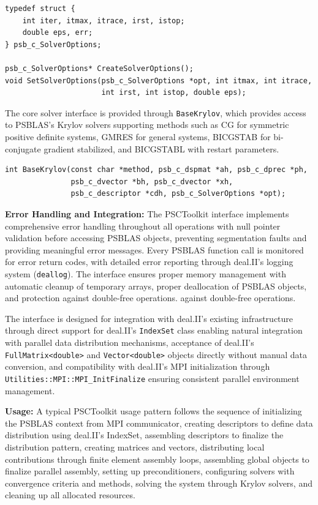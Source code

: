 \documentclass[a4paper,12pt]{article}
\begin{document}
\begin{lstlisting}[caption=Solver options structure and management]
typedef struct {
    int iter, itmax, itrace, irst, istop;
    double eps, err;
} psb_c_SolverOptions;

psb_c_SolverOptions* CreateSolverOptions();
void SetSolverOptions(psb_c_SolverOptions *opt, int itmax, int itrace,
                      int irst, int istop, double eps);
\end{lstlisting}

The core solver interface is provided through \texttt{BaseKrylov}, which provides access to 
PSBLAS's Krylov solvers supporting methods such as CG for symmetric positive definite 
systems, GMRES for general systems, BICGSTAB for bi-conjugate gradient stabilized, 
and BICGSTABL with restart parameters.

\begin{lstlisting}[caption=Krylov solver interface]
int BaseKrylov(const char *method, psb_c_dspmat *ah, psb_c_dprec *ph,
               psb_c_dvector *bh, psb_c_dvector *xh,
               psb_c_descriptor *cdh, psb_c_SolverOptions *opt);
\end{lstlisting}

\textbf{Error Handling and Integration:} The PSCToolkit interface implements 
comprehensive error handling throughout all operations with null pointer validation 
before accessing PSBLAS objects, preventing segmentation faults and providing meaningful 
error messages. Every PSBLAS function call is monitored for error return codes, with 
detailed error reporting through deal.II's logging system (\texttt{deallog}). The 
interface ensures proper memory management with automatic cleanup of temporary arrays, 
proper deallocation of PSBLAS objects, and protection against double-free operations.
against double-free operations.

The interface is designed for integration with deal.II's existing 
infrastructure through direct support for deal.II's \texttt{IndexSet} 
class enabling natural integration with parallel data distribution mechanisms, 
acceptance of deal.II's \texttt{FullMatrix<double>} and \texttt{Vector<double>} 
objects directly without manual data conversion, and compatibility with deal.II's 
MPI initialization through \texttt{Utilities::MPI::MPI\_InitFinalize} ensuring 
consistent parallel environment management.

\textbf{Usage:} A typical PSCToolkit usage pattern follows the sequence of initializing 
the PSBLAS context from MPI communicator, creating descriptors to define data 
distribution using deal.II's IndexSet, assembling descriptors to finalize the 
distribution pattern, creating matrices and vectors, distributing local 
contributions through finite element assembly loops, assembling global 
objects to finalize parallel assembly, setting up preconditioners, configuring 
solvers with convergence criteria and methods, solving the system through Krylov 
solvers, and cleaning up all allocated resources.
\end{document}
